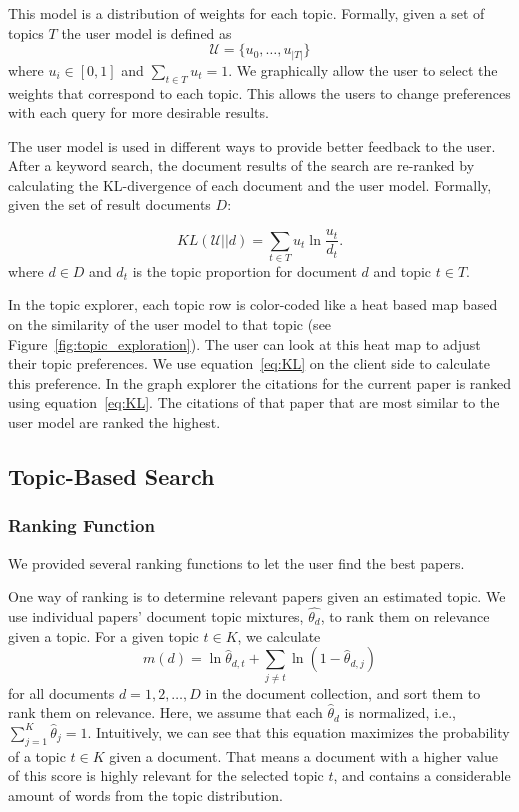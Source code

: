 This model is a distribution of weights for each topic.
Formally, given a set of topics $T$ the user model is defined as
$$
\mathcal{U} = \{u_0, \ldots, u_{|T|}\}
$$
where $u_i \in [0,1]$ and $\sum_{t \in T} u_t = 1$.
We graphically allow the user to select the weights that correspond to
each topic. This allows the users to change preferences with each query
for more desirable results.

The user model is used in different ways to provide better feedback to
the user. After a keyword search, the document results of the search 
are re-ranked by calculating the KL-divergence of each document and the
user model. Formally, given the set of result documents $D$:

\begin{equation} \label{eq:KL}
KL(\mathcal{U}||d) = \sum_{t \in T} u_t \ln \frac{u_t}{d_t}.
\end{equation}
where $d \in D$ and $d_t$ is the topic proportion for document $d$ and
topic $t \in T$. 

In the topic explorer, each topic row is color-coded like a heat 
based map based on the similarity of the user model to that topic (see Figure~\ref{fig:topic_exploration}).
The user can look at this heat map to adjust their topic preferences.
We use equation~\ref{eq:KL} on the client side to calculate this preference. 
In the graph explorer the citations for the current paper is ranked
using equation~\ref{eq:KL}. The citations of that paper that are most
similar to the user model are ranked the highest.


\subsection{Topic-Based Search}

\subsubsection{Ranking Function}
We provided several ranking functions to let the user find
the best papers.

One way of ranking is to determine relevant papers 
given an estimated topic. We use individual papers'
document topic mixtures, $\hat{\theta_d}$, to rank them 
on relevance given a topic. For a given 
topic $t \in K$, we calculate
\begin{equation}
m(d) = \ln \hat{\theta}_{d,t} + \sum_{j \neq t}{\ln (1 - \hat{\theta}_{d,j})}
\end{equation}
for all documents $d = 1, 2, \ldots, D$ in 
the document collection, and sort them to rank
them on relevance. Here, we assume that
each $\hat{\theta}_d$ is normalized, 
i.e., $\sum_{j=1}^{K}{\hat{\theta}_j} = 1$.
Intuitively, we can see that this equation maximizes the probability
of a topic $t \in K$ given a document.
That means a document with a higher value of this score is 
highly relevant for the selected topic $t$, and contains 
a considerable amount of words from the topic distribution.    



